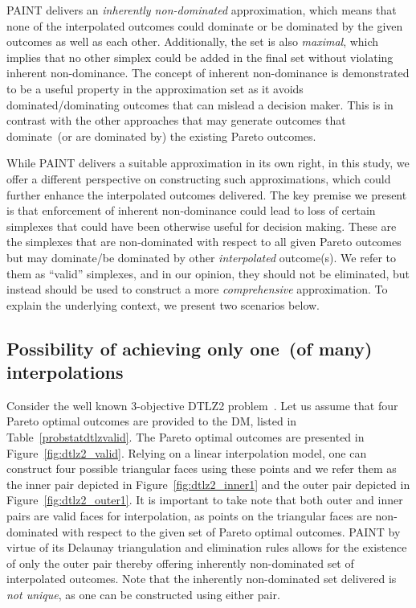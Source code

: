 {	PAINT delivers an \textit{inherently non-dominated} approximation, which means that none of the interpolated outcomes could dominate or be dominated by the given outcomes as well as each other. Additionally, the set is also \textit{maximal}, which implies that no other simplex could be added in the final set without violating inherent non-dominance.} The concept of inherent non-dominance is demonstrated to be a useful property in the approximation set as it avoids {\color{blue}dominated/dominating} outcomes that can mislead a decision maker. This is in contrast with the other approaches that may generate outcomes that dominate~(or are dominated by) the existing Pareto outcomes.

{\color{blue}
	While PAINT delivers a suitable approximation in its own right, in this study, we offer a different perspective on constructing such approximations, which could further enhance the interpolated outcomes delivered. The key premise we present is that enforcement of inherent non-dominance could lead to loss of certain simplexes that could have been otherwise useful for decision making. These are the simplexes that are non-dominated with respect to all given Pareto outcomes but may dominate/be dominated by other \emph{interpolated} outcome(s). We refer to them as ``valid'' simplexes, and in our opinion, they should not be eliminated, but instead should be used to construct a more \emph{comprehensive} approximation. To explain the underlying context, we present two scenarios below.
}
\subsection{Possibility of achieving only one~(of many) interpolations} Consider the well known 3-objective DTLZ2 problem~\cite{deb2002scalable}. Let us assume that four Pareto optimal outcomes are provided to the DM, listed in Table~\ref{probstatdtlzvalid}. The Pareto optimal outcomes are presented in Figure~\ref{fig:dtlz2_valid}. Relying on a linear interpolation model, one can construct four possible triangular faces using these points and we refer them as the inner pair depicted in Figure~\ref{fig:dtlz2_inner1} and the outer pair depicted in Figure~\ref{fig:dtlz2_outer1}. It is important to take note that both outer and inner pairs are valid faces for interpolation, as points on the triangular faces are non-dominated with respect to the given set of Pareto optimal outcomes. PAINT by virtue of its Delaunay triangulation and elimination rules allows for the existence of only the outer pair thereby offering inherently non-dominated set of interpolated outcomes. {\color{blue}Note that the inherently non-dominated set delivered is \textit{not unique}, as one can be constructed using either pair.} 

